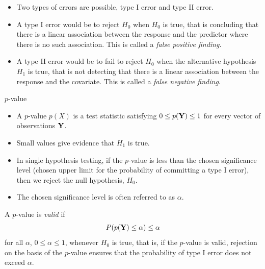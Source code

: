 \documentclass[
  ignorenonframetext,
]{beamer}
\providecommand{\tightlist}{%
  \setlength{\itemsep}{0pt}\setlength{\parskip}{0pt}}
\begin{document}
\begin{frame}

\begin{itemize}
\tightlist
\item
  Two types of errors are possible, type I error and type II error.
\item
  A type I error would be to reject \(H_0\) when \(H_0\) is true, that
  is concluding that there is a linear association between the response
  and the predictor where there is no such association. This is called a
  \emph{false positive finding}.
\item
  A type II error would be to fail to reject \(H_0\) when the
  alternative hypothesis \(H_1\) is true, that is not detecting that
  there is a linear association between the response and the covariate.
  This is called a \emph{false negative finding}.
\end{itemize}

\end{frame}

\begin{frame}

\begin{block}{\(p\)-value}

\begin{itemize}
\tightlist
\item
  A \(p\)-value \(p(X)\) is a test statistic satisfying
  \(0 \leq p({\bf Y}) \leq 1\) for every vector of observations
  \(\bf{Y}\).
\item
  Small values give evidence that \(H_1\) is true.
\item
  In single hypothesis testing, if the \(p\)-value is less than the
  chosen significance level (chosen upper limit for the probability of
  committing a type I error), then we reject the null hypothesis,
  \(H_0\).
\item
  The chosen significance level is often referred to as \(\alpha\).
\end{itemize}

\end{block}

\end{frame}

\begin{frame}

A \(p\)-value is \emph{valid} if
\[ P(p(\bf{Y}) \leq \alpha) \leq \alpha \] for all \(\alpha\),
\(0 \leq \alpha \leq 1\), whenever \(H_0\) is true, that is, if the
\(p\)-value is valid, rejection on the basis of the \(p\)-value ensures
that the probability of type I error does not exceed \(\alpha\).

\end{frame}
\end{document}
